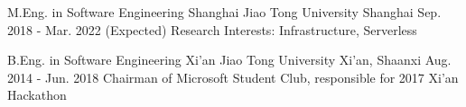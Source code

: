 

\begin{cventries}

  \cventry
    {M.Eng. in Software Engineering} %
    {Shanghai Jiao Tong University} %
    {Shanghai} %
    {Sep. 2018 - Mar. 2022 (Expected)} %
    {Research Interests: Infrastructure, Serverless}

  \cventry
    {B.Eng. in Software Engineering} %
    {Xi'an Jiao Tong University} %
    {Xi'an, Shaanxi} %
    {Aug. 2014 - Jun. 2018} %
    {Chairman of Microsoft Student Club, responsible for 2017 Xi'an Hackathon}

\end{cventries}
